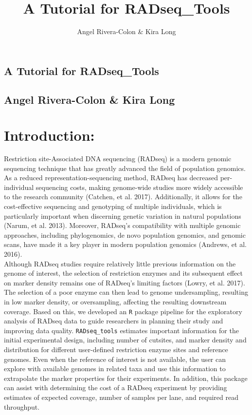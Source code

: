 \documentclass{article}
\title{A Tutorial for RADseq_Tools}
\author{Angel Rivera-Colon & Kira Long}
\begin{document}



\begin{center}
\section*{\huge A Tutorial for RADseq\_Tools}
\subsection*{\Large Angel Rivera-Colon \& Kira Long}
\end{center}


\section{Introduction:}

Restriction site-Associated DNA sequencing (RADseq) is a modern genomic sequencing technique that has greatly advanced the field of population genomics. As a reduced representation-sequencing method, RADseq has decreased per-individual sequencing costs, making genome-wide studies more widely accessible to the research community (Catchen, et al. 2017). Additionally, it allows for the cost-effective sequencing and genotyping of multiple individuals, which is particularly important when discerning genetic variation in natural populations (Narum, et al. 2013). Moreover, RADseq’s compatibility with multiple genomic approaches, including phylogenomics, de novo population genomics, and genomic scans, have made it a key player in modern population genomics (Andrews, et al. 2016).\\
Although RADseq studies require relatively little previous information on the genome of interest, the selection of restriction enzymes and its subsequent effect on marker density remains one of RADseq’s limiting factors (Lowry, et al. 2017). The selection of a poor enzyme can then lead to genome undersampling, resulting in low marker density, or oversampling, affecting the resulting downstream coverage. Based on this, we developed an \texttt{R} package pipeline for the exploratory analysis of RADseq data to guide researchers in planning their study and improving data quality. \texttt{RADseq\_tools} estimates important information for the initial experimental design, including number of cutsites, and marker density and distribution for different user-defined restriction enzyme sites and reference genomes. Even when the reference of interest is not available, the user can explore with available genomes in related taxa and use this information to extrapolate the marker properties for their experiments. In addition, this package can assist with determining the cost of a RADseq experiment by providing estimates of expected coverage, number of samples per lane, and required read throughput. 
\end{document}
